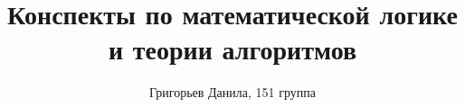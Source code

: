 \documentclass{book}
\begin{document}
\title{Конспекты по математической логике и теории алгоритмов}
\author{Григорьев Данила, 151 группа}

\maketitle

\tableofcontents
















\end{document}
